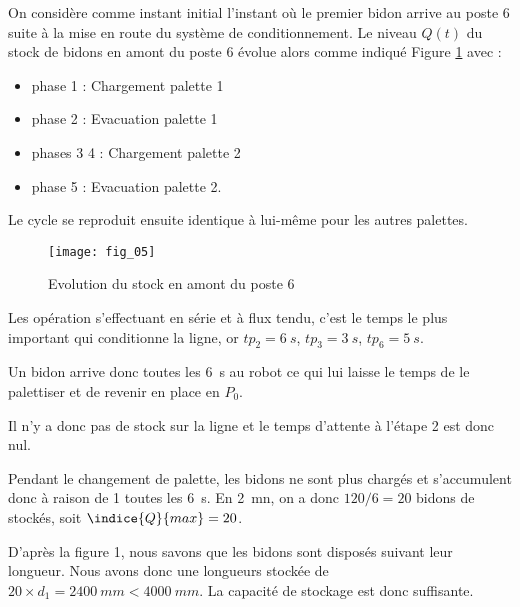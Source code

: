 \ifprof
\else

On considère comme instant initial l’instant où le premier bidon arrive au poste 6 suite à la 
mise en route du système de conditionnement. Le niveau $Q(t)$ du stock de bidons en amont du 
poste 6 évolue alors comme indiqué Figure \ref{kuka:fig:05} avec :
\begin{itemize}
\item phase 1 : Chargement palette 1 
\item phase 2 : Evacuation palette 1 
\item phases 3 4 : Chargement palette 2 
\item phase 5 : Evacuation palette 2.
\end{itemize}

Le cycle se reproduit ensuite identique à lui-même pour les autres palettes. 


\begin{figure}[H]
\centering
\texttt{[image: fig\_05]}
\caption{Evolution du stock en amont du poste 6\label{kuka:fig:05}}
\end{figure}
\fi


\ifprof
\begin{corrige}
Les opération s’effectuant en série et à flux tendu, c’est le temps le plus important qui 
conditionne la ligne, or $tp_2=\SI{6}{s}$, $tp_3=\SI{3}{s}$, $tp_6=\SI{5}{s}$. 

Un bidon arrive donc toutes les \SI{6}{s} au robot ce qui lui laisse le temps de le palettiser et de 
revenir en place en $P_0$. 

Il n’y a donc pas de stock sur la ligne et le temps d’attente à l’étape 2 est donc nul. 
\end{corrige}
\else
\fi

\ifprof
\begin{corrige}
Pendant le changement de palette, les bidons ne sont plus chargés et s’accumulent donc à 
raison de 1 toutes les \SI{6}{s}. 
En \SI{2}{mn}, on a donc $120/6=20$ bidons de stockés, soit $\indice{Q}{max}=20$.

D’après la figure 1, nous savons que les bidons sont disposés suivant leur longueur. 
Nous avons donc une longueurs stockée de $20\times d_1=\SI{2400}{mm}<\SI{4000}{mm}$. 
La capacité de stockage est donc suffisante.
\end{corrige}
\else
\fi

